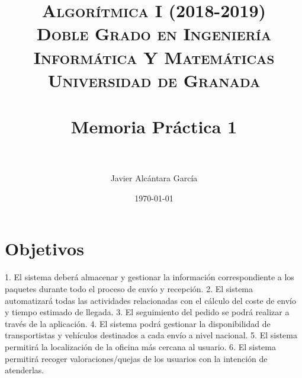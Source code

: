 



\title{	
\normalfont \normalsize 
\textsc{\textbf{Algorítmica I (2018-2019)} \\ Doble Grado en Ingeniería Informática Y Matemáticas \\ Universidad de Granada} \\ [25pt] %
\horrule{0.5pt} \\[0.4cm] %
\huge Memoria Práctica 1 \\ %
\horrule{2pt} \\[0.5cm] %
}

\author{Javier Alcántara García} %

\date{\normalsize\today} %





\maketitle %

\newpage %

\tableofcontents %

\listoffigures

\listoftables

\newpage


\section{Objetivos}
1. El sistema deberá almacenar y gestionar la información correspondiente a los paquetes durante todo el proceso de envío y recepción.
2. El sistema automatizará todas las actividades relacionadas con el cálculo del coste de envío y tiempo estimado de llegada.
3. El seguimiento del pedido se podrá realizar a través de la aplicación.
4. El sistema podrá gestionar la disponibilidad de transportistas y vehículos destinados a cada envío a nivel nacional.
5. El sistema permitirá la localización de la oficina más cercana al usuario.
6. El sistema permitirá recoger valoraciones/quejas de los usuarios con la intención de atenderlas.
 

